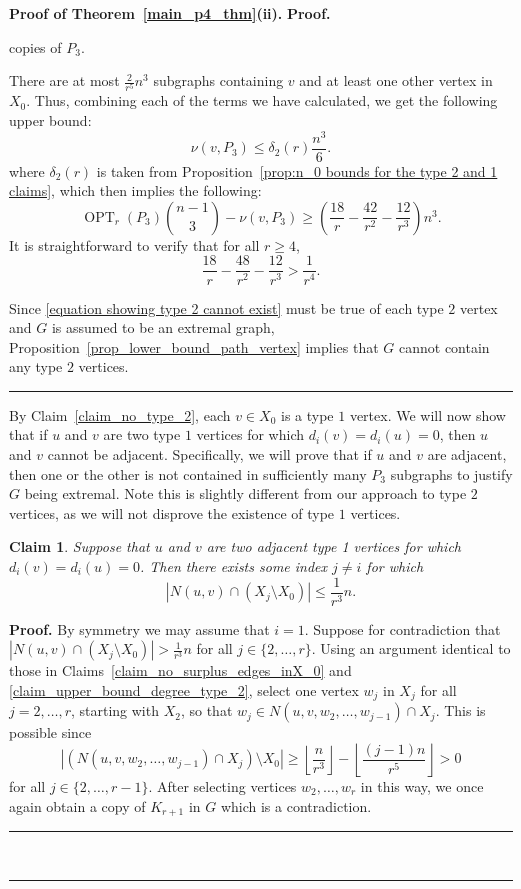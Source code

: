 \documentclass[12pt]{article}
\newtheorem{claim}[thm]{Claim}
\DeclareMathOperator{\OPT}{OPT}
\renewenvironment{proof}[1][Proof]{\textbf{#1.} }{\ \rule{0.5em}{0.5em}}
\begin{document}
\begin{proof}[Proof of Theorem~\ref{main_p4_thm}(ii)]
\begin{proof}
\begin{enumerate}
\[    \]
    copies of $P_3$.
\end{enumerate}
There are at most $\frac{2}{r^5}n^3$ subgraphs containing $v$ and at least one other vertex in $X_0$. Thus, combining each of the terms we have calculated, we get the following upper bound: 
\[ \nu(v,P_3) \leq \delta_2(r)\frac{n^3}{6}.\]
where $\delta_2(r)$ is taken from Proposition~\ref{prop:n_0 bounds for the type 2 and 1 claims}, which then implies the following: 
\begin{equation}\label{equation showing type 2 cannot exist}
    \OPT_r(P_3) \binom{n-1}{3} - \nu(v,P_3) \geq \left(\frac{18}{r} - \frac{42}{r^2} - \frac{12}{r^3} \right)n^3.
\end{equation}
It is straightforward to verify that for all $r  \geq  4$,
\[ 
\frac{18}{r} - \frac{48}{r^2} - \frac{12}{r^3} > \frac{1}{r^4}.
\]

Since \eqref{equation showing type 2 cannot exist} must be true of each type $2$ vertex and $G$ is assumed to be an extremal graph, Proposition~\ref{prop_lower_bound_path_vertex} implies that $G$ cannot contain any type $2$ vertices.
\end{proof}

By Claim~\ref{claim_no_type_2}, each $v \in X_0$ is a type $1$ vertex. We will now show that if $u$ and $v$ are two type $1$ vertices for which $d_i(v) = d_i(u) = 0$, then $u$ and $v$ cannot be adjacent. Specifically, we will prove that if $u$ and $v$ are adjacent, then one or the other is not contained in sufficiently many $P_3$ subgraphs to justify $G$ being extremal. Note this is slightly different from our approach to type $2$ vertices, as we will not disprove the existence of type $1$ vertices. 

\begin{claim}\label{claim_shared_neighborhood_type_one}
Suppose that $u$ and $v$ are two adjacent type 1 vertices for which $d_i(v) = d_i(u) = 0$. Then there exists some index $j \neq i$ for which 
\[ |N(u,v) \cap (X_j \setminus X_0)| \leq \frac{1}{r^3}n.\]
\end{claim}

\begin{proof}
By symmetry we may assume that $i = 1$. Suppose for contradiction that $|N(u,v) \cap (X_j \setminus X_0)| > \frac{1}{r^3}n$ for all $j \in \{2,\dots,r\}$. Using an argument identical to those in Claims~\ref{claim_no_surplus_edges_inX_0} and \ref{claim_upper_bound_degree_type_2}, select one vertex $w_j$ in $X_j$ for all $j = 2,\dots,r$, starting with $X_2$, so that $w_j \in N(u,v,w_2,\dots,w_{j-1}) \cap X_j$. This is possible since
\[
| (N(u,v,w_2,\dots,w_{j-1}) \cap X_j) \setminus X_0 | \geq \left\lfloor\frac{n}{r^3}\right\rfloor - \left\lfloor\frac{(j-1)n}{r^5}\right\rfloor > 0
\]
for all $j \in \{2,\dots,r-1\}$. After selecting vertices $w_2,\dots,w_r$ in this way, we once again obtain a copy of $K_{r+1}$ in $G$ which is a contradiction.
\end{proof}


\end{proof}
\end{document}
